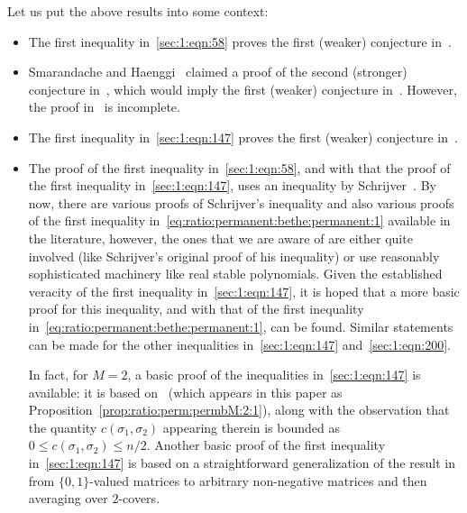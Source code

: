 \documentclass[journal,lettersize,twocolumn]{IEEEtran} %
\begin{document}
%

Let us put the above results into some context:
\begin{itemize}

\item The first inequality in~\eqref{sec:1:eqn:58} proves the first (weaker)
  conjecture in~\cite[Conjecture 52]{Vontobel2013a}.

\item Smarandache and Haenggi~\cite{Smarandache2016} claimed a proof of the
  second (stronger) conjecture in~\cite[Conjecture 52]{Vontobel2013a}, which
  would imply the first (weaker) conjecture in~\cite[Conjecture
  52]{Vontobel2013a}. However, the proof in~\cite{Smarandache2016} is
  incomplete.

\item The first inequality in~\eqref{sec:1:eqn:147} proves the first (weaker)
  conjecture in~\cite[Conjecture 51]{Vontobel2013a}.

\item The proof of the first inequality in~\eqref{sec:1:eqn:58}, and with that
  the proof of the first inequality in~\eqref{sec:1:eqn:147}, uses an
  inequality by Schrijver~\cite{Schrijver1998}. By now, there are various
  proofs of Schrijver's inequality and also various proofs of the first
  inequality in~\eqref{eq:ratio:permanent:bethe:permanent:1} available in the
  literature, however, the ones that we are aware of are either quite involved
  (like Schrijver's original proof of his inequality) or use reasonably
  sophisticated machinery like real stable polynomials. Given the established
  veracity of the first inequality in~\eqref{sec:1:eqn:147}, it is hoped that
  a more basic proof for this inequality, and with that of the first
  inequality in~\eqref{eq:ratio:permanent:bethe:permanent:1}, can be
  found. Similar statements can be made for the other inequalities
  in~\eqref{sec:1:eqn:147} and~\eqref{sec:1:eqn:200}.

  In fact, for $M = 2$, a basic proof of the inequalities
  in~\eqref{sec:1:eqn:147} is available: it is based
  on~\cite[Proposition~2]{KitShing2022} (which appears in this paper as
  Proposition~\ref{prop:ratio:perm:permbM:2:1}), along with the observation
  that the quantity $c(\sigma_1,\sigma_2)$ appearing therein is bounded as
  $0 \leq c(\sigma_1,\sigma_2) \leq n/2$. Another basic proof of the first
  inequality in~\eqref{sec:1:eqn:147} is based on a straightforward
  generalization of the result in~\cite[Lemma 4.2]{Csikvari2017} from
  $\{0,1\}$-valued matrices to arbitrary non-negative matrices and then
  averaging over $2$-covers.


\end{itemize}
\end{document}

